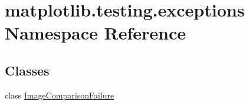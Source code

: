 \hypertarget{namespacematplotlib_1_1testing_1_1exceptions}{}\section{matplotlib.\+testing.\+exceptions Namespace Reference}
\label{namespacematplotlib_1_1testing_1_1exceptions}
\subsection*{Classes}
\begin{DoxyCompactItemize}
\item 
class \hyperlink{classmatplotlib_1_1testing_1_1exceptions_1_1ImageComparisonFailure}{Image\+Comparison\+Failure}
\end{DoxyCompactItemize}
